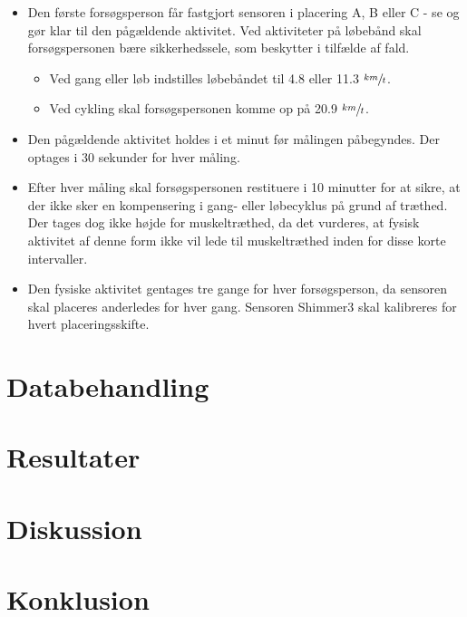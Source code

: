 \begin{itemize}
	\item Den første forsøgsperson får fastgjort sensoren i placering A, B eller C - se  og gør klar til den pågældende aktivitet. Ved aktiviteter på løbebånd skal forsøgspersonen bære sikkerhedssele, som beskytter i tilfælde af fald.
	\begin{itemize}
		\item Ved gang eller løb indstilles løbebåndet til 4.8 eller 11.3 $\sfrac{km}{t}$.
		\item Ved cykling skal forsøgspersonen komme op på 20.9 $\sfrac{km}{t}$.
	\end{itemize}
	\item Den pågældende aktivitet holdes i et minut før målingen påbegyndes. Der optages i 30 sekunder for hver måling.
	\item Efter hver måling skal forsøgspersonen restituere i 10 minutter for at sikre, at der ikke sker en kompensering i gang- eller løbecyklus på grund af træthed. Der tages dog ikke højde for muskeltræthed, da det vurderes, at fysisk aktivitet af denne form ikke vil lede til muskeltræthed inden for disse korte intervaller.
	\item Den fysiske aktivitet gentages tre gange for hver forsøgsperson, da sensoren skal placeres anderledes for hver gang. Sensoren Shimmer3 skal kalibreres for hvert placeringsskifte.
\end{itemize}

\section{Databehandling}

\section{Resultater}

\section{Diskussion}

\section{Konklusion}

